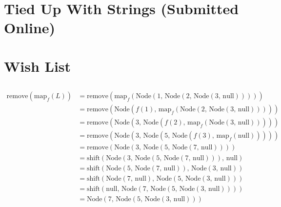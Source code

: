 \documentclass[11pt]{article}
\begin{document}
\section{Tied Up With Strings (Submitted Online)} %

\section{Wish List} %

\subsection{} %
\begin{align*}
	\text{remove}(\text{map}_f(L)) &= \text{remove}(\text{map}_f(\text{Node}(1\text{, } \text{Node}(2\text{, } \text{Node}(3\text{, } \text{null}))))) \tag*{Replace L}\\
	&= \text{remove}(\text{Node}(f(1)\text{, } \text{map}_f(\text{Node}(2\text{, } \text{Node}(3\text{, } \text{null}))))) \tag*{Definition of map$_f$}\\
	&= \text{remove}(\text{Node}(3\text{, } \text{Node}(f(2)\text{, } \text{map}_f(\text{Node}(3\text{, } \text{null}))))) \tag*{Definition of map$_f$}\\
	&= \text{remove}(\text{Node}(3\text{, } \text{Node}(5\text{, } \text{Node}(f(3)\text{, } \text{map}_f(\text{null}))))) \tag*{Definition of map$_f$}\\
	&= \text{remove}(\text{Node}(3\text{, } \text{Node}(5\text{, } \text{Node}(7\text{, } \text{null})))) \tag*{Definition of map$_f$} \\
	&= \text{shift}(\text{Node}(3\text{, } \text{Node}(5\text{, } \text{Node}(7\text{, } \text{null})))\text{, } \text{null}) \tag*{Definition of remove()}\\
	&= \text{shift}(\text{Node}(5\text{, } \text{Node}(7\text{, }\text{null}))\text{, } \text{Node}(3\text{, } \text{null})) \tag*{Definition of shift()}\\
	&= \text{shift}(\text{Node}(7\text{, } \text{null})\text{, } \text{Node}(5\text{, } \text{Node}(3\text{, } \text{null}))) \tag*{Definition of shift()}\\
	&= \text{shift}(\text{null}\text{, } \text{Node}(7\text{, } \text{Node}(5\text{, } \text{Node}(3\text{, } \text{null})))) \tag*{Definition of shift()} \\
	&= \text{Node}(7\text{, } \text{Node}(5\text{, } \text{Node}(3\text{, } \text{null}))) \tag*{Definition of shift()}\\
\end{align*}
\end{document}
